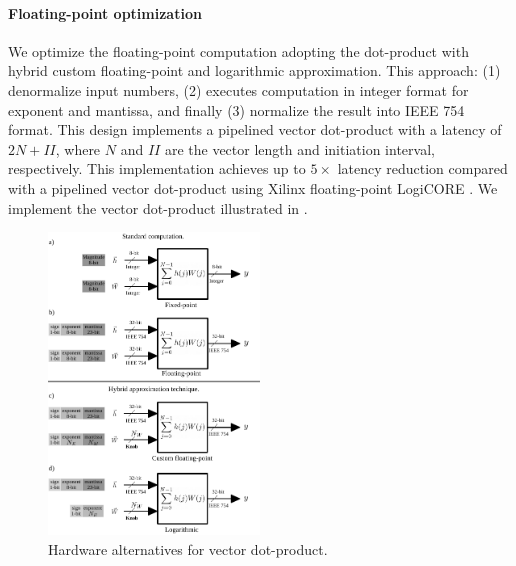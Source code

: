 \paragraph{Floating-point optimization}
We optimize the floating-point computation adopting the dot-product with hybrid custom floating-point and logarithmic approximation\cite{nevarez2021accelerating}. This approach: (1) denormalize input numbers, (2) executes computation in integer format for exponent and mantissa, and finally (3) normalize the result into IEEE 754 format. This design implements a pipelined vector dot-product with a latency of $2N+II$, where $N$ and $II$ are the vector length and initiation interval, respectively. This implementation achieves up to $5\times$ latency reduction compared with a pipelined vector dot-product using Xilinx floating-point LogiCORE \cite{nevarez2021accelerating}. We implement the vector dot-product illustrated in .

\begin{figure}[t!]
	\centering
	\includegraphics[width=0.5\textwidth]{../figures/dot-product_unit.pdf}
	\caption{Hardware alternatives for vector dot-product.}
	\label{fig:dot_product}
\end{figure}


